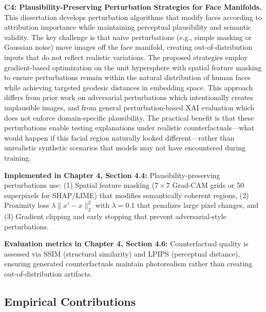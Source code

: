 \textbf{C4: Plausibility-Preserving Perturbation Strategies for Face Manifolds.} This dissertation develops perturbation algorithms that modify faces according to attribution importance while maintaining perceptual plausibility and semantic validity. The key challenge is that naive perturbations (e.g., simple masking or Gaussian noise) move images off the face manifold, creating out-of-distribution inputs that do not reflect realistic variations. The proposed strategies employ gradient-based optimization on the unit hypersphere with spatial feature masking to ensure perturbations remain within the natural distribution of human faces while achieving targeted geodesic distances in embedding space. This approach differs from prior work on adversarial perturbations \cite{dong2019efficient} which intentionally creates implausible images, and from general perturbation-based XAI evaluation \cite{hooker2019roar} which does not enforce domain-specific plausibility. The practical benefit is that these perturbations enable testing explanations under realistic counterfactuals---what would happen if this facial region naturally looked different---rather than unrealistic synthetic scenarios that models may not have encountered during training.

\vspace{0.3cm}
\noindent\textbf{Implemented in Chapter 4, Section 4.4:} Plausibility-preserving perturbations use: (1) Spatial feature masking ($7\times 7$ Grad-CAM grids or 50 superpixels for SHAP/LIME) that modifies semantically coherent regions, (2) Proximity loss $\lambda \|x' - x\|_2^2$ with $\lambda = 0.1$ that penalizes large pixel changes, and (3) Gradient clipping and early stopping that prevent adversarial-style perturbations.

\vspace{0.3cm}
\noindent\textbf{Evaluation metrics in Chapter 4, Section 4.6:} Counterfactual quality is assessed via SSIM (structural similarity) and LPIPS (perceptual distance), ensuring generated counterfactuals maintain photorealism rather than creating out-of-distribution artifacts.

\subsection{Empirical Contributions}


